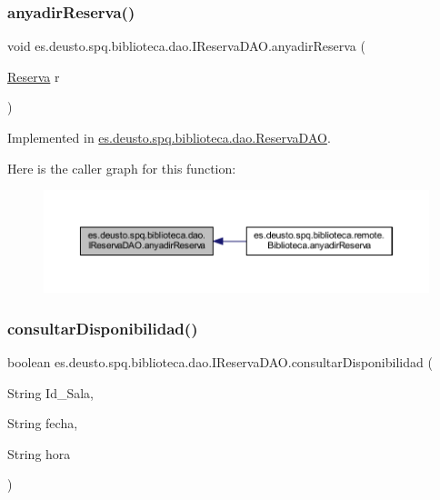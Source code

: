 \subsubsection{\texorpdfstring{anyadir\+Reserva()}{anyadirReserva()}}
{\footnotesize\ttfamily void es.\+deusto.\+spq.\+biblioteca.\+dao.\+I\+Reserva\+D\+A\+O.\+anyadir\+Reserva (\begin{DoxyParamCaption}\item[{\mbox{\hyperlink{classes_1_1deusto_1_1spq_1_1biblioteca_1_1data_1_1_reserva}{Reserva}}}]{r }\end{DoxyParamCaption})}



Implemented in \mbox{\hyperlink{classes_1_1deusto_1_1spq_1_1biblioteca_1_1dao_1_1_reserva_d_a_o_ab4d4780399982bd5241fc772664e26a3}{es.\+deusto.\+spq.\+biblioteca.\+dao.\+Reserva\+D\+AO}}.

Here is the caller graph for this function\+:
\nopagebreak
\begin{figure}[H]
\begin{center}
\leavevmode
\includegraphics[width=350pt]{interfacees_1_1deusto_1_1spq_1_1biblioteca_1_1dao_1_1_i_reserva_d_a_o_a6e0188fb8b5510723e4bc27e838c9fa1_icgraph}
\end{center}
\end{figure}
\mbox{\label{interfacees_1_1deusto_1_1spq_1_1biblioteca_1_1dao_1_1_i_reserva_d_a_o_a81c0cf35733fcd11e44e121d72098236}} 
\subsubsection{\texorpdfstring{consultar\+Disponibilidad()}{consultarDisponibilidad()}}
{\footnotesize\ttfamily boolean es.\+deusto.\+spq.\+biblioteca.\+dao.\+I\+Reserva\+D\+A\+O.\+consultar\+Disponibilidad (\begin{DoxyParamCaption}\item[{String}]{Id\+\_\+\+Sala,  }\item[{String}]{fecha,  }\item[{String}]{hora }\end{DoxyParamCaption})}



